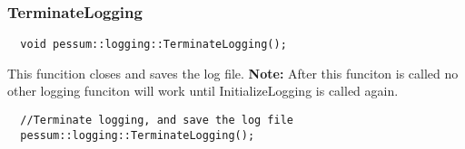 \documentclass{subfiles}
\begin{document}
\subsubsection{TerminateLogging}
\begin{lstlisting}
  void pessum::logging::TerminateLogging();
\end{lstlisting}
This funcition closes and saves the log file. \textbf{Note:} After this funciton is called no other logging funciton will work until InitializeLogging is called again.
\begin{lstlisting}
  //Terminate logging, and save the log file
  pessum::logging::TerminateLogging();
\end{lstlisting}
\newpage
\end{document}
